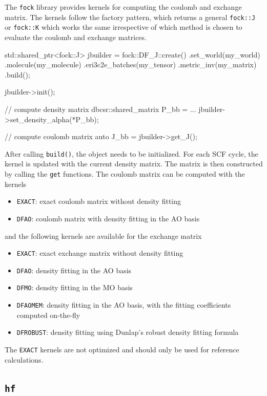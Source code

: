 The \texttt{fock} library provides kernels for computing the coulomb and exchange matrix. The kernels follow the factory pattern, which returns a general \texttt{fock::J} or \texttt{fock::K} which works the same irrespective of which method is chosen to evaluate the coulomb and exchange matrices.
\begin{cppinline}
std::shared_ptr<fock::J> 
jbuilder = fock::DF_J::create()
	.set_world(my_world)
	.molecule(my_molecule)
	.eri3c2e_batches(my_tensor)
	.metric_inv(my_matrix)
	.build();
	
jbuilder->init();

// compute density matrix 
dbcsr::shared_matrix P_bb = ...
jbuilder->set_density_alpha(*P_bb);

// compute coulomb matrix
auto J_bb = jbuilder->get_J();
\end{cppinline} 
\noindent After calling \texttt{build()}, the object needs to be initialized. For each SCF cycle, the kernel is updated with the current density matrix. The matrix is then constructed by calling the \texttt{get} functions. The coulomb matrix can be computed with the kernels
\begin{itemize}
\item \texttt{EXACT}: exact coulomb matrix without density fitting
\item \texttt{DFAO}: coulomb matrix with density fitting in the AO basis
\end{itemize}
\noindent and the following kernels are available for the exchange matrix
\begin{itemize}
\item \texttt{EXACT}: exact exchange matrix without density fitting
\item \texttt{DFAO}: density fitting in the AO basis
\item \texttt{DFMO}: density fitting in the MO basis
\item \texttt{DFAOMEM}: density fitting in the AO basis, with the fitting coefficients computed on-the-fly
\item \texttt{DFROBUST}: density fitting using Dunlap's robust density fitting formula 
\end{itemize}

\noindent The \texttt{EXACT} kernels are not optimized and should only be used for reference calculations. 

\subsection{\texttt{hf}}

